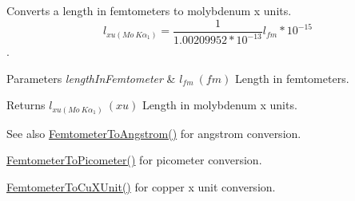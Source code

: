Converts a length in femtometers to molybdenum x units. \[ l_{xu(Mo\ K\alpha_1)}=\frac{1}{1.00209952*10^{-13}} l_{fm} * 10^{-15}\]. 


\begin{DoxyParams}{Parameters}
{\em length\+In\+Femtometer} & $ l_{fm}\ (fm)$ Length in femtometers. \\
\hline
\end{DoxyParams}
\begin{DoxyReturn}{Returns}
$ l_{xu(Mo\ K\alpha_1)}\ (xu)$ Length in molybdenum x units. 
\end{DoxyReturn}
\begin{DoxySeeAlso}{See also}
\mbox{\hyperlink{group___e_g_x_math-_conversions-_length_conversions-_s_i-_femtometer-_non-_s_i_ga72862654ebe3812db0fbf8d11d7059ff}{Femtometer\+To\+Angstrom()}} for angstrom conversion. 

\mbox{\hyperlink{group___e_g_x_math-_conversions-_length_conversions-_s_i-_femtometer-_s_i_gadfcd6b374d4134cad0ac1ce7a8e50509}{Femtometer\+To\+Picometer()}} for picometer conversion. 

\mbox{\hyperlink{group___e_g_x_math-_conversions-_length_conversions-_s_i-_femtometer-_non-_s_i_ga59bde341fe80506851e39cd2ceb3747b}{Femtometer\+To\+Cu\+X\+Unit()}} for copper x unit conversion. 
\end{DoxySeeAlso}
